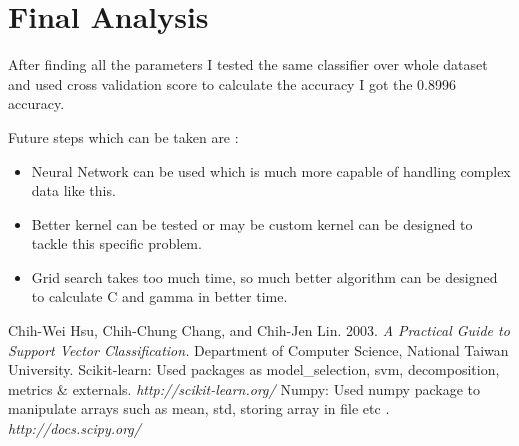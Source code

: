 \documentclass[a4paper, 11pt]{article}
\begin{document}
\section*{Final Analysis}
After finding all the parameters I tested the same classifier over whole dataset and used cross validation score to calculate the accuracy I got the 0.8996 accuracy.

Future steps which can be taken are :
\begin{itemize}
	\item Neural Network can be used which is much more capable of handling complex data like this.
	\item Better kernel can be tested or may be custom kernel can be designed to tackle this specific problem.
	\item Grid search takes too much time, so much better algorithm can be designed to calculate C and gamma in better time. 
\end{itemize} 
\begin{thebibliography}{9} 
Chih-Wei Hsu, Chih-Chung Chang, and Chih-Jen Lin. 2003. \emph{A Practical Guide to Support Vector Classification.}  Department of Computer Science, National Taiwan University. 
 Scikit-learn: Used packages as model\_selection, svm, decomposition, metrics \& externals. \emph{http://scikit-learn.org/}
 Numpy: Used numpy package to manipulate arrays such as mean, std, storing array in file etc . \emph{http://docs.scipy.org/}
\end{thebibliography}
\end{document}

